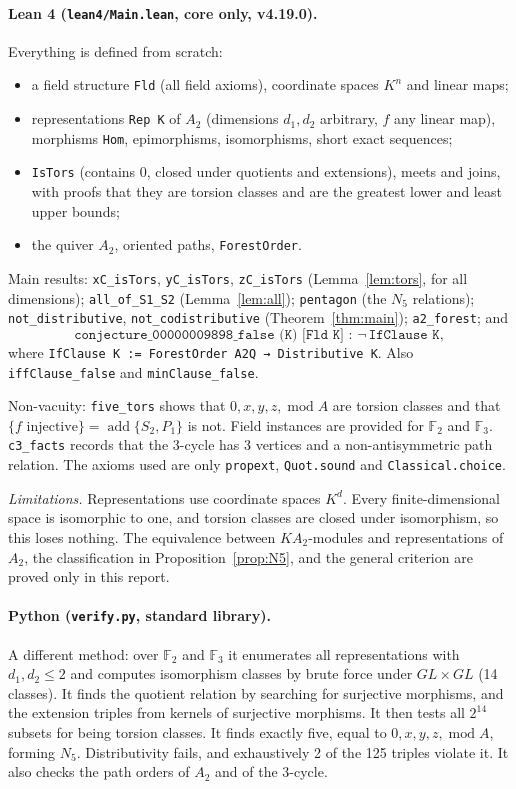 \documentclass[11pt]{article}
\theoremstyle{definition}
\theoremstyle{remark}
\newcommand{\add}{\operatorname{add}}
\newcommand{\md}{\operatorname{mod}}
\begin{document}
\paragraph{Lean 4 (\texttt{lean4/Main.lean}, core only, v4.19.0).} Everything is defined from
scratch:
\begin{itemize}
\item a field structure \texttt{Fld} (all field axioms), coordinate spaces $K^n$ and linear maps;
\item representations \texttt{Rep K} of $A_2$ (dimensions $d_1,d_2$ arbitrary, $f$ any linear
map), morphisms \texttt{Hom}, epimorphisms, isomorphisms, short exact sequences;
\item \texttt{IsTors} (contains $0$, closed under quotients and extensions), meets and joins, with
proofs that they are torsion classes and are the greatest lower and least upper bounds;
\item the quiver $A_2$, oriented paths, \texttt{ForestOrder}.
\end{itemize}
Main results: \texttt{xC\_isTors}, \texttt{yC\_isTors}, \texttt{zC\_isTors} (Lemma~\ref{lem:tors},
for all dimensions); \texttt{all\_of\_S1\_S2} (Lemma~\ref{lem:all}); \texttt{pentagon} (the $N_5$
relations); \texttt{not\_distributive}, \texttt{not\_codistributive} (Theorem~\ref{thm:main});
\texttt{a2\_forest}; and
\[
\texttt{conjecture\_00000009898\_false (K) [Fld K] : }\neg\,\texttt{IfClause K},
\]
where \texttt{IfClause K := ForestOrder A2Q → Distributive K}. Also \texttt{iffClause\_false} and
\texttt{minClause\_false}.

Non-vacuity: \texttt{five\_tors} shows that $0,x,y,z,\md A$ are torsion classes and that
$\{f\text{ injective}\}=\add\{S_2,P_1\}$ is not. Field instances are provided for $\mathbb F_2$
and $\mathbb F_3$. \texttt{c3\_facts} records that the 3-cycle has 3 vertices and a
non-antisymmetric path relation. The axioms used are only \texttt{propext}, \texttt{Quot.sound}
and \texttt{Classical.choice}.

\emph{Limitations.} Representations use coordinate spaces $K^{d}$. Every finite-dimensional
space is isomorphic to one, and torsion classes are closed under isomorphism, so this loses
nothing. The equivalence between $KA_2$-modules and representations of $A_2$, the classification
in Proposition~\ref{prop:N5}, and the general criterion are proved only in this report.

\paragraph{Python (\texttt{verify.py}, standard library).} A different method: over $\mathbb F_2$
and $\mathbb F_3$ it enumerates all representations with $d_1,d_2\le2$ and computes isomorphism
classes by brute force under $GL\times GL$ (14 classes). It finds the quotient relation by
searching for surjective morphisms, and the extension triples from kernels of surjective
morphisms. It then tests all $2^{14}$ subsets for being torsion classes. It finds exactly five,
equal to $0,x,y,z,\md A$, forming $N_5$. Distributivity fails, and exhaustively 2 of the 125
triples violate it. It also checks the path orders of $A_2$ and of the 3-cycle.
\end{document}
